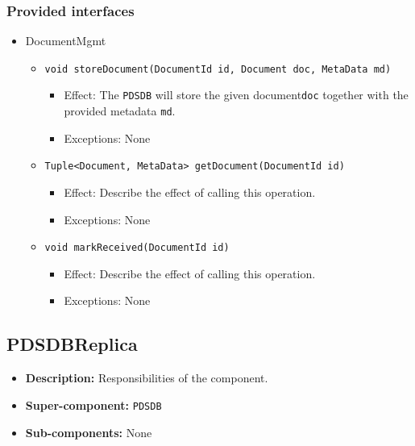 \documentclass[a4paper,10pt]{article}
\begin{document}
\subsubsection*{Provided interfaces}
\begin{itemize}
    \item DocumentMgmt
    \begin{itemize}
        \item \texttt{void storeDocument(DocumentId id, Document doc, MetaData md)}
        \begin{itemize}
            \item Effect: The \texttt{PDSDB} will store the given document\texttt{doc} together with the provided metadata \texttt{md}.
            \item Exceptions:  None 
        \end{itemize}

        \item \texttt{Tuple<Document, MetaData> getDocument(DocumentId id)}
        \begin{itemize}
            \item Effect: Describe the effect of calling this operation.
            \item Exceptions: None
         \end{itemize}
         
         \item \texttt{void markReceived(DocumentId id)}
        \begin{itemize}
            \item Effect: Describe the effect of calling this operation.
            \item Exceptions: None
         \end{itemize}
    \end{itemize}
\end{itemize}

\subsection{PDSDBReplica}
\begin{itemize}
    \item \textbf{Description:} Responsibilities of the component.
    \item \textbf{Super-component:} \texttt{PDSDB}
    \item \textbf{Sub-components:} None
\end{itemize}
\end{document}
